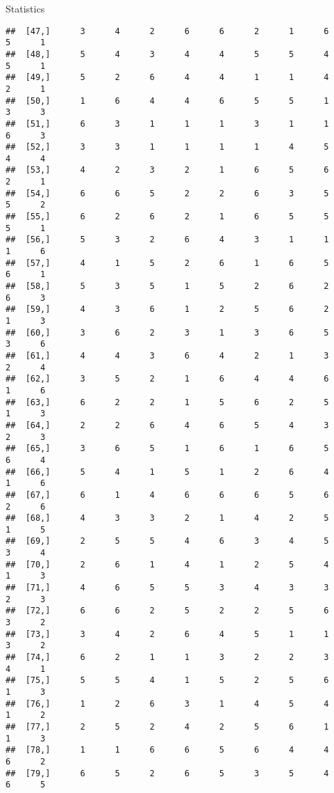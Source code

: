 \documentclass[
  ignorenonframetext,
]{beamer}
\begin{document}
\begin{frame}[fragile]{Statistics}
\begin{verbatim}
##  [47,]      3      4      2      6      6      2      1      6      5      1
##  [48,]      5      4      3      4      4      5      5      4      5      1
##  [49,]      5      2      6      4      4      1      1      4      2      1
##  [50,]      1      6      4      4      6      5      5      1      3      3
##  [51,]      6      3      1      1      1      3      1      1      6      3
##  [52,]      3      3      1      1      1      1      4      5      4      4
##  [53,]      4      2      3      2      1      6      5      6      2      1
##  [54,]      6      6      5      2      2      6      3      5      5      2
##  [55,]      6      2      6      2      1      6      5      5      5      1
##  [56,]      5      3      2      6      4      3      1      1      1      6
##  [57,]      4      1      5      2      6      1      6      5      6      1
##  [58,]      5      3      5      1      5      2      6      2      6      3
##  [59,]      4      3      6      1      2      5      6      2      1      3
##  [60,]      3      6      2      3      1      3      6      5      3      6
##  [61,]      4      4      3      6      4      2      1      3      2      4
##  [62,]      3      5      2      1      6      4      4      6      1      6
##  [63,]      6      2      2      1      5      6      2      5      1      3
##  [64,]      2      2      6      4      6      5      4      3      2      3
##  [65,]      3      6      5      1      6      1      6      5      6      4
##  [66,]      5      4      1      5      1      2      6      4      1      6
##  [67,]      6      1      4      6      6      6      5      6      2      6
##  [68,]      4      3      3      2      1      4      2      5      1      5
##  [69,]      2      5      5      4      6      3      4      5      3      4
##  [70,]      2      6      1      4      1      2      5      4      1      3
##  [71,]      4      6      5      5      3      4      3      3      2      3
##  [72,]      6      6      2      5      2      2      5      6      3      2
##  [73,]      3      4      2      6      4      5      1      1      3      2
##  [74,]      6      2      1      1      3      2      2      3      4      1
##  [75,]      5      5      4      1      5      2      5      6      1      3
##  [76,]      1      2      6      3      1      4      5      4      1      2
##  [77,]      2      5      2      4      2      5      6      1      1      3
##  [78,]      1      1      6      6      5      6      4      4      6      2
##  [79,]      6      5      2      6      5      3      5      4      6      5

\end{verbatim}
\end{frame}
\end{document}

